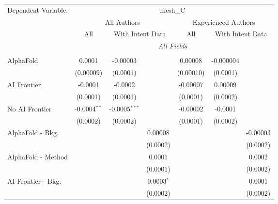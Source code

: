 \begingroup
\centering
\begin{tabular}{lcccccc}
   \tabularnewline \midrule \midrule
   Dependent Variable: & \multicolumn{6}{c}{mesh\_C}\\
 & \multicolumn{3}{c}{All Authors} & \multicolumn{3}{c}{Experienced Authors} \\
\cmidrule(lr){2-4} \cmidrule(lr){5-7}
 & \multicolumn{1}{c}{All} & \multicolumn{2}{c}{With Intent Data} & \multicolumn{1}{c}{All} & \multicolumn{2}{c}{With Intent Data} \\
\cmidrule(lr){2-2} \cmidrule(lr){3-4} \cmidrule(lr){5-5} \cmidrule(lr){6-7}
 & \multicolumn{6}{c}{\textit{All Fields}} \\ \\
   AlphaFold               & 0.0001         & -0.00003        &                 & 0.00008   & -0.000004 &   \\   
                           & (0.00009)      & (0.0001)        &                 & (0.00010) & (0.0001)  &   \\   
   AI Frontier             & -0.0001        & -0.0002         &                 & -0.00007  & 0.00009   &   \\   
                           & (0.0001)       & (0.0001)        &                 & (0.0001)  & (0.0002)  &   \\   
   No AI Frontier          & -0.0004$^{**}$ & -0.0005$^{***}$ &                 & -0.00002  & -0.0001   &   \\   
                           & (0.0002)       & (0.0002)        &                 & (0.0001)  & (0.0002)  &   \\   
   AlphaFold - Bkg.        &                &                 & 0.00008         &           &           & -0.00003\\   
                           &                &                 & (0.0002)        &           &           & (0.0002)\\   
   AlphaFold - Method      &                &                 & 0.0001          &           &           & 0.0002\\   
                           &                &                 & (0.0001)        &           &           & (0.0002)\\   
   AI Frontier - Bkg.      &                &                 & 0.0003$^{*}$    &           &           & 0.0001\\   
                           &                &                 & (0.0002)        &           &           & (0.0002)\\   

\end{tabular}
